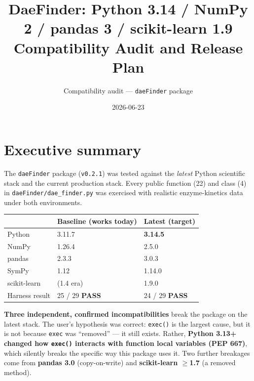 \documentclass[11pt]{article}
\title{\textbf{DaeFinder: Python 3.14 / NumPy 2 / pandas 3 / scikit-learn 1.9\\
Compatibility Audit and Release Plan}}
\author{Compatibility audit --- \texttt{daeFinder} package}
\date{2026-06-23}
\newcommand{\code}[1]{\texttt{\small #1}}
\newcommand{\PASS}{\textcolor{pass}{\textbf{PASS}}}
\begin{document}
\maketitle

\section{Executive summary}

The \code{daeFinder} package (\code{v0.2.1}) was tested against the \emph{latest}
Python scientific stack and the current production stack. Every public function
(22) and class (4) in \code{daeFinder/dae\_finder.py} was exercised with realistic
enzyme-kinetics data under both environments.

\begin{center}
\begin{tabular}{lll}
\toprule
 & \textbf{Baseline (works today)} & \textbf{Latest (target)} \\
\midrule
Python      & 3.11.7   & \textbf{3.14.5} \\
NumPy       & 1.26.4   & 2.5.0 \\
pandas      & 2.3.3    & 3.0.3 \\
SymPy       & 1.12     & 1.14.0 \\
scikit-learn& (1.4 era)& 1.9.0 \\
\midrule
Harness result & 25 / 29 \PASS{} & 24 / 29 \PASS{} \\
\bottomrule
\end{tabular}
\end{center}

\textbf{Three independent, confirmed incompatibilities} break the package on the
latest stack. The user's hypothesis was correct: \code{exec()} is the largest
cause, but it is not because \code{exec} was ``removed'' --- it still exists.
Rather, \textbf{Python 3.13+ changed how \code{exec()} interacts with function
local variables (PEP 667)}, which silently breaks the specific way this package
uses it. Two further breakages come from \textbf{pandas 3.0} (copy-on-write) and
\textbf{scikit-learn $\ge$1.7} (a removed method).
\end{document}
